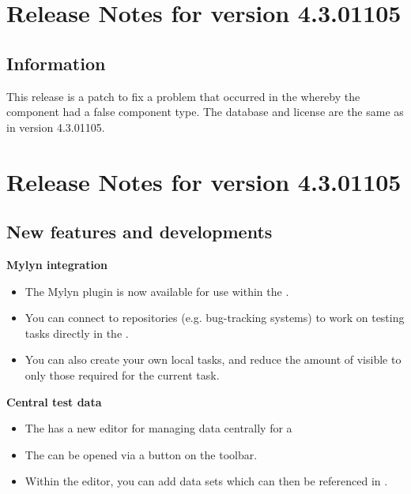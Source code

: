 \makeatletter
\section{Release Notes for version 4.3.01105}
\makeatother
\subsection{Information}
This release is a patch to fix a problem that occurred in the  whereby the  component had a false component type. The database and license are the same as in version 4.3.01105. 

\makeatletter
\section{Release Notes for version 4.3.01105}
\makeatother
\subsection{New features and developments}
\textbf{Mylyn integration}
\begin{itemize}
\item The Mylyn plugin is now available for use within the \ite{}. 
\item You can connect to repositories (e.g. bug-tracking systems) to work on testing tasks directly in the \ite{}.
\item You can also create your own local tasks, and reduce the amount of \gdcases{} visible to only those required for the current task.
\end{itemize}
\textbf{Central test data}
\begin{itemize}
\item The \ite{} has a new editor for managing data centrally for a \gdproject{}
\item The \gddataeditor{} can be opened via a button on the toolbar.
\item Within the editor, you can add data sets which can then be referenced in \gdcases{}. 
\end{itemize}

